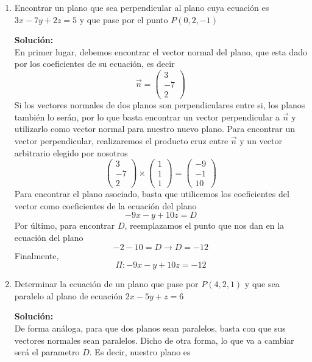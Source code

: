 \documentclass[12pt]{article}
\newenvironment{solucion}
{\begin{mdframed}[backgroundcolor=black!10]
		{\bf Solución:}\\
	}
	{
	\end{mdframed}
}
\newenvironment{preguntas}
{\begin{enumerate}\itemsep12pt
	}
	{
	\end{enumerate}
}
\newcommand{\ra}{\rightarrow}
\begin{document}
\begin{preguntas}
\begin{solucion}
$$\begin{array}{rcrr}
		A & = & -4C & \vline\\
		\hline
		\end{array}
		$$
		Le daremos un valor arbitrario a $C$
		$$C = 3$$
		$$ \ra B = 2$$
		$$ \ra A = -12 $$
		$$ \ra D = -12 $$
		Con lo que obtenemos el plano
		$$\Pi_2: -12x+2y+3z = -12$$
		Finalmente, los planos buscados son:
		$$\Pi_1: -6x + 4y + 3z = 0$$		
		$$\Pi_2: -12x+2y+3z = -12$$
\end{solucion}
\item Encontrar un plano que sea perpendicular al plano cuya ecuación es $3x -7y +2z = 5$ y que pase por el punto $P(0,2,-1)$
\begin{solucion}
En primer lugar, debemos encontrar el vector normal del plano, que esta dado por los coeficientes de su ecuación, es decir
		$$\vec{n} = \begin{pmatrix}
		3\\-7\\2
		\end{pmatrix}$$
		Si los vectores normales de dos planos son perpendiculares entre si, los planos también lo serán, por lo que basta encontrar un vector perpendicular a $\vec{n}$ y utilizarlo como vector normal para nuestro nuevo plano. Para encontrar un vector perpendicular, realizaremos el producto cruz entre $\vec{n}$ y un vector arbitrario elegido por nosotros
		$$\begin{pmatrix} 3 \\ -7 \\ 2 \end{pmatrix} \times \begin{pmatrix} 1 \\ 1 \\ 1 \end{pmatrix} = \begin{pmatrix} -9 \\ -1 \\ 10 \end{pmatrix}$$
		Para encontrar el plano asociado, basta que utilicemos los coeficientes del vector como coeficientes de la ecuación del plano
		$$-9x -y +10z = D$$
		Por último, para encontrar $D$, reemplazamos el punto que nos dan en la ecuación del plano
		$$-2 -10 = D \ra D = -12$$
		Finalmente,
		$$\Pi: -9x -y +10z = -12$$
\end{solucion}
\item Determinar la ecuación de un plano que pase por $P(4,2,1)$ y que sea paralelo al plano de ecuación $2x-5y+z=6$
\begin{solucion}
De forma análoga, para que dos planos sean paralelos, basta con que sus vectores normales sean paralelos. Dicho de otra forma, lo que va a cambiar será el parametro $D$. Es decir, nuestro plano es

\end{solucion}
\end{preguntas}
\end{document}

